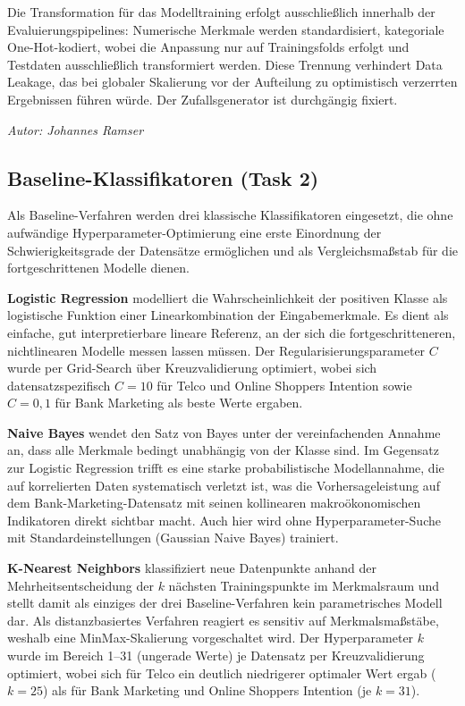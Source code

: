 \documentclass[10pt]{scrartcl}
\begin{document}
Die Transformation für das Modelltraining erfolgt ausschließlich innerhalb der Evaluierungspipelines: Numerische Merkmale werden standardisiert, kategoriale One-Hot-kodiert, wobei die Anpassung nur auf Trainingsfolds erfolgt und Testdaten ausschließlich transformiert werden. Diese Trennung verhindert Data Leakage, das bei globaler Skalierung vor der Aufteilung zu optimistisch verzerrten Ergebnissen führen würde. Der Zufallsgenerator ist durchgängig fixiert.

\begin{flushright}\textit{Autor: Johannes Ramser}\end{flushright}

\subsection{Baseline-Klassifikatoren (Task 2)}

Als Baseline-Verfahren werden drei klassische Klassifikatoren eingesetzt, die ohne aufwändige Hyperparameter-Optimierung eine erste Einordnung der Schwierigkeitsgrade der Datensätze ermöglichen und als Vergleichsmaßstab für die fortgeschrittenen Modelle dienen.

\textbf{Logistic Regression} \cite{HastieESL2009} modelliert die Wahrscheinlichkeit der positiven Klasse als logistische Funktion einer Linearkombination der Eingabemerkmale. Es dient als einfache, gut interpretierbare lineare Referenz, an der sich die fortgeschritteneren, nichtlinearen Modelle messen lassen müssen. Der Regularisierungsparameter $C$ wurde per Grid-Search über Kreuzvalidierung optimiert, wobei sich datensatzspezifisch $C=10$ für Telco und Online Shoppers Intention sowie $C=0{,}1$ für Bank Marketing als beste Werte ergaben.

\textbf{Naive Bayes} \cite{BishopPRML2006} wendet den Satz von Bayes unter der vereinfachenden Annahme an, dass alle Merkmale bedingt unabhängig von der Klasse sind. Im Gegensatz zur Logistic Regression trifft es eine starke probabilistische Modellannahme, die auf korrelierten Daten systematisch verletzt ist, was die Vorhersageleistung auf dem Bank-Marketing-Datensatz mit seinen kollinearen makroökonomischen Indikatoren direkt sichtbar macht. Auch hier wird ohne Hyperparameter-Suche mit Standardeinstellungen (Gaussian Naive Bayes) trainiert.

\textbf{K-Nearest Neighbors} \cite{HastieESL2009} klassifiziert neue Datenpunkte anhand der Mehrheitsentscheidung der $k$ nächsten Trainingspunkte im Merkmalsraum und stellt damit als einziges der drei Baseline-Verfahren kein parametrisches Modell dar. Als distanzbasiertes Verfahren reagiert es sensitiv auf Merkmalsmaßstäbe, weshalb eine MinMax-Skalierung vorgeschaltet wird. Der Hyperparameter $k$ wurde im Bereich 1--31 (ungerade Werte) je Datensatz per Kreuzvalidierung optimiert, wobei sich für Telco ein deutlich niedrigerer optimaler Wert ergab ($k=25$) als für Bank Marketing und Online Shoppers Intention (je $k=31$).
\end{document}
